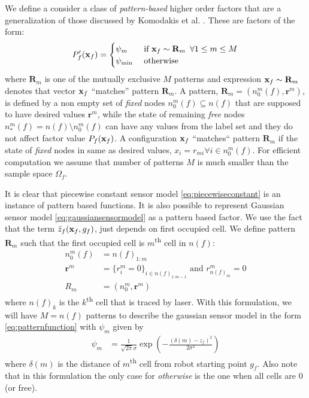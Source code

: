 \documentclass[letterpaper, 10 pt, conference]{ieeeconf} %
\newcommand{\vect}[1]{\mathbf{#1}}
\begin{document}
We define a consider a class of \emph{pattern-based} higher order factors that
are a generalization of those discussed by Komodakis et al.
\cite{komodakis2009beyond}. These are factors of the form:
\begin{align}
  P'_f(\map_f) = \begin{cases}
    \psi_{m} & \text{ if $\map_f \sim \vect{R}_m$} \,\,\, \forall 1 \le m \le M\\
    \psi_{\text{min}} & \text{ otherwise}
  \end{cases}
  \label{eq:patternfunction}
\end{align}
where $\vect{R}_m$ is one of the mutually exclusive $M$ patterns and
expression $\map_f \sim \vect{R}_m$ denotes that vector $\map_f$
``matches'' pattern $\vect{R}_m$.  
A pattern, $\vect{R}_m = (n^m_0(f), \vect{r}^m)$, is defined by a non empty set
of \emph{fixed} nodes $n^m_0(f) \subseteq n(f)$ that are supposed to have
desired values $\vect{r}^m$, while the state of remaining \emph{free} nodes
$n^m_*(f) = n(f) \setminus n^m_0(f)$ can have any values from the label set 
and they do not affect factor value $P_f(\map_f)$. A configuration
$\map_f$ ``matches`` pattern $\vect{R}_m$ if the state of \emph{fixed}
nodes in same as desired values, $x_i = r_{mi} \forall i \in n^m_0(f)$.
For efficient computation we assume that number of patterns $M$ is much
smaller than the sample space $\Omega_f$.

It is clear that piecewise constant sensor model \eqref{eq:piecewiseconstant}
is an instance of pattern based functions. It is also possible to represent
Gaussian sensor model \eqref{eq:gaussiansensormodel} as a pattern based
factor. We use the fact that
the term $\bar{z}_f(\map_f, g_f)$, just depends on first occupied cell. We
define pattern $\vect{R}_m$ such that the first occupied cell is
$m$\textsuperscript{th} cell in $n(f)$:
\begin{align}
  n^m_0(f) &= n(f)_{1:m}\\
\vect{r}^m &= \{ r^m_{i} = 0 \}_{i \in n(f)_{1:m-1}} \text{ and } r^m_{n(f)_m} = 0\\
       R_m &= (n^m_0, \vect{r}^m)
\end{align}
where $n(f)_{k}$ is the $k$\textsuperscript{th} cell that is traced by laser. With
this formulation, we will have $M = n(f)$ patterns to describe the gaussian
sensor model in the form \eqref{eq:patternfunction} with $\psi_m$ given by
\begin{align}
  \psi_m &= \frac{1}{\sqrt{2\pi}\sigma}\exp\left(-\frac{(\delta(m)- z_f)^2}{2\sigma^2}\right)
\end{align}
where $\delta(m)$ is the distance of $m$\textsuperscript{th} cell from robot
starting point $g_f$. Also note that in this formulation the only case for
\emph{otherwise} is the one when all cells are $0$ (or free).
\end{document}
